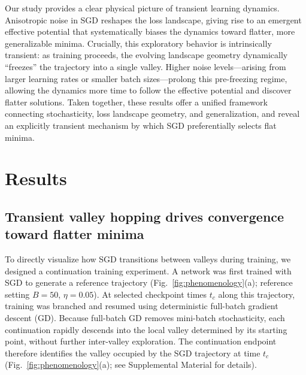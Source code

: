 \documentclass[aps,prx,reprint,superscriptaddress,longbibliography,nofootinbib,floatfix]{revtex4-2}
\begin{document}
Our study provides a clear physical picture of transient learning dynamics. Anisotropic noise in SGD reshapes the loss landscape, giving rise to an emergent effective potential that systematically biases the dynamics toward flatter, more generalizable minima. Crucially, this exploratory behavior is intrinsically transient: as training proceeds, the evolving landscape geometry dynamically ``freezes'' the trajectory into a single valley. Higher noise levels---arising from larger learning rates or smaller batch sizes---prolong this pre-freezing regime, allowing the dynamics more time to follow the effective potential and discover flatter solutions. Taken together, these results offer a unified framework connecting stochasticity, loss landscape geometry, and generalization, and reveal an explicitly transient mechanism by which SGD preferentially selects flat minima.

\section{Results}
\subsection{Transient valley hopping drives convergence toward flatter minima}


To directly visualize how SGD transitions between valleys during training, we designed a continuation training experiment. A network was first trained with SGD to generate a reference trajectory (Fig.~\ref{fig:phenomenology}(a); reference setting $B = 50$, $\eta = 0.05$). At selected checkpoint times $t_c$ along this trajectory, training was branched and resumed using deterministic full-batch gradient descent (GD). Because full-batch GD removes mini-batch stochasticity, each continuation rapidly descends into the local valley determined by its starting point, without further inter-valley exploration. The continuation endpoint therefore identifies the valley occupied by the SGD trajectory at time $t_c$ (Fig.~\ref{fig:phenomenology}(a); see Supplemental Material for details). 
\end{document}
